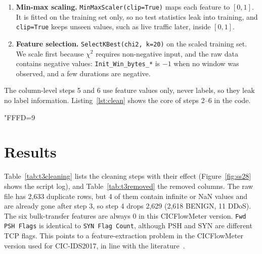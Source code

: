 \begin{enumerate}
	\item \textbf{Min-max scaling.} \texttt{MinMaxScaler(clip=True)} maps each feature to $[0,1]$. It is fitted on the training set only, so no test statistics leak into training, and \texttt{clip=True} keeps unseen values, such as live traffic later, inside $[0,1]$.
	\item \textbf{Feature selection.} \texttt{SelectKBest(chi2, k=20)} on the scaled training set. We scale first because $\chi^2$ requires non-negative input, and the raw data contains negative values: \texttt{Init\_Win\_bytes\_*} is $-1$ when no window was observed, and a few durations are negative.
\end{enumerate}

The column-level steps 5 and 6 use feature values only, never labels, so they leak no label information. Listing~\ref{lst:clean} shows the core of steps 2--6 in the code.

{\catcode"FFFD=9 }

\section{Results}\label{sec:t3-results}


Table~\ref{tab:t3cleaning} lists the cleaning steps with their effect (Figure~\ref{fig:ss28} shows the script log), and Table~\ref{tab:t3removed} the removed columns. The raw file has 2,633 duplicate rows, but 4 of them contain infinite or NaN values and are already gone after step 3, so step 4 drops 2,629 (2,618 BENIGN, 11 DDoS). The six bulk-transfer features are always 0 in this CICFlowMeter version. \texttt{Fwd PSH Flags} is identical to \texttt{SYN Flag Count}, although PSH and SYN are different TCP flags. This points to a feature-extraction problem in the CICFlowMeter version used for CIC-IDS2017, in line with the literature~\cite{engelen2021troubleshooting}.

\begin{table}[ht]
	\centering\small
	
	\caption{Cleaning steps. The column counts include the \texttt{Label} column, so the 60 remaining columns are 59 features plus \texttt{Label}. Loading and label normalization happen before step 1.}
	\label{tab:t3cleaning}
\end{table}

